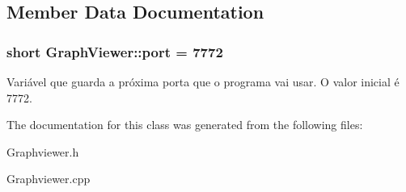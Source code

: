 \subsection{Member Data Documentation}
\hypertarget{classGraphViewer_a89d0abe75f41feededc49497cc514342}{
\subsubsection[{port}]{\setlength{\rightskip}{0pt plus 5cm}short Graph\-Viewer\-::port = 7772\hspace{0.3cm}{\ttfamily [static]}}}\label{classGraphViewer_a89d0abe75f41feededc49497cc514342}
Variável que guarda a próxima porta que o programa vai usar. O valor inicial é 7772. 

The documentation for this class was generated from the following files\-:\begin{DoxyCompactItemize}
\item 
Graphviewer.\-h\item 
Graphviewer.\-cpp\end{DoxyCompactItemize}
